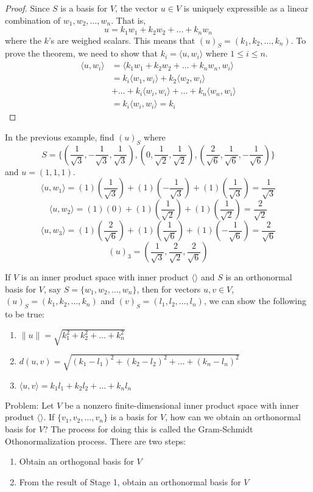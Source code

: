 \documentclass[12pt]{article}
\begin{document}
\begin{proof} Since $S$ is a basis for $V$, the vector $u \in V$ is uniquely expressible as a linear combination of $w_1, w_2, \dots, w_n$. That is, $$u = k_1w_1 + k_2w_2 + \dots + k_nw_n$$ where the $k$'s are weighed scalars. This means that $(u)_S = (k_1, k_2, \dots, k_n)$. To prove the theorem, we need to show that $ k_i = \langle u, w_i \rangle $ where $1 \leq i \leq n$. $$\begin{aligned} \langle u, w_i \rangle &= \langle k_1w_1 + k_2w_2 + \dots + k_nw_n, w_i \rangle \\ &= k_i\langle w_1, w_i \rangle + k_2\langle w_2, w_i \rangle \\ &+ \dots + k_i\langle w_i, w_i \rangle + \dots + k_n\langle w_n, w_i \rangle \\ &= k_i\langle w_i, w_i \rangle = k_i \end{aligned} $$ \end{proof}
\begin{example} In the previous example, find $(u)_S$ where $$S = \{(\frac{1}{\sqrt{3}}, -\frac{1}{\sqrt{3}}, \frac{1}{\sqrt{3}}), (0, \frac{1}{\sqrt{2}}, \frac{1}{\sqrt{2}}), (\frac{2}{\sqrt{6}}, \frac{1}{\sqrt{6}}, -\frac{1}{\sqrt{6}})\}$$ and $u = (1, 1, 1)$. $$\langle u, w_1 \rangle = (1)(\frac{1}{\sqrt{3}}) + (1)(-\frac{1}{\sqrt{3}}) + (1)(\frac{1}{\sqrt{3}}) = \frac{1}{\sqrt{3}} $$ $$ \langle u, w_2 \rangle = (1)(0) + (1)(\frac{1}{\sqrt{2}}) + (1)(\frac{1}{\sqrt{2}}) = \frac{2}{\sqrt{2}} $$ $$\langle u, w_3 \rangle = (1)(\frac{2}{\sqrt{6}}) + (1)(\frac{1}{\sqrt{6}}) + (1)(-\frac{1}{\sqrt{6}}) = \frac{2}{\sqrt{6}} $$ $$(u)_3 = (\frac{1}{\sqrt{3}}, \frac{2}{\sqrt{2}}, \frac{2}{\sqrt{6}}) $$ \end{example} 
If $V$ is an inner product space with inner product $\langle \rangle$ and $S$ is an orthonormal basis for $V$, say $S = \{w_1, w_2, \dots, w_n\}$, then for vectors $u, v \in V$, $(u)_S = (k_1, k_2, \dots, k_n)$ and $(v)_S = (l_1, l_2, \dots, l_n)$, we can show the following to be true: \begin{enumerate} 
\item $\|u\| = \sqrt{k_1^2 + k_2^2 + \dots + k_n^2} $ 
\item $d(u, v) = \sqrt{(k_1 - l_1)^2 + (k_2 - l_2)^2 + \dots + (k_n - l_n)^2} $
\item $\langle u, v \rangle = k_1l_1 + k_2l_2 + \dots + k_nl_n $
\end{enumerate} 
Problem: Let $V$ be a nonzero finite-dimensional inner product space with inner product $\langle \rangle$. If $\{v_1, v_2, \dots, v_n\}$ is a basis for $V$, how can we obtain an orthonormal basis for $V$? The process for doing this is called the Gram-Schmidt Othonormalization process. There are two steps: \begin{enumerate} 
\item Obtain an orthogonal basis for $V$ \item From the result of Stage 1, obtain an orthonormal basis for $V$ \end{enumerate} 
\end{document}
